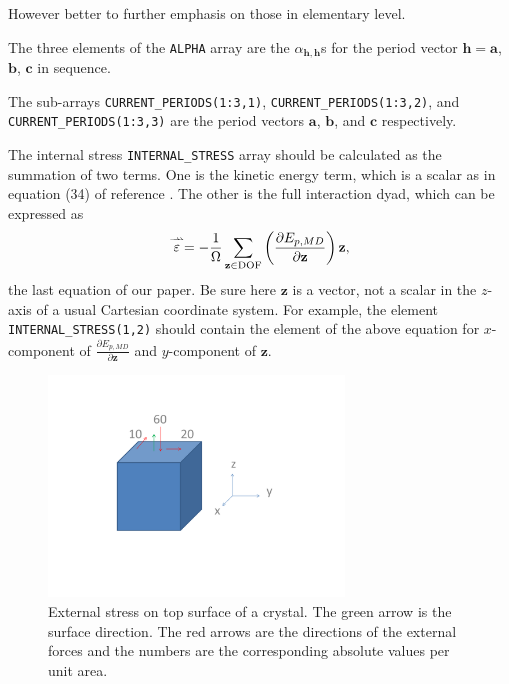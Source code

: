 \documentclass[aps]{revtex4}
\newcommand{\srr}[1]{\stackrel{\rightharpoonup\!\!\!\!\rightharpoonup }{#1}}
\newcommand{\Tep}[0]{\srr{\cal\varepsilon}}
\newcommand{\bh}[0]{\mathbf h}
\newcommand{\ba}{\mathbf a}
\newcommand{\bb}{\mathbf b}
\newcommand{\bc}{\mathbf c}
\begin{document}
However better to further emphasis on those in elementary level.  

The three elements of the \verb!ALPHA! array are the $\alpha _{\bh,\bh}$s for the period vector $\bh=\ba$, $\bb$, $\bc$ in sequence.

The sub-arrays \verb!CURRENT_PERIODS(1:3,1)!,  \verb!CURRENT_PERIODS(1:3,2)!, and  \verb!CURRENT_PERIODS(1:3,3)! 
are the period vectors $\ba$, $\bb$, and $\bc$ respectively. 

The internal stress \verb!INTERNAL_STRESS! array should be 
calculated as the summation of two terms. One is 
the kinetic energy term, which is a scalar as in equation (34) of reference \cite{glarxiv}. The other is the full interaction dyad, which can be 
expressed as
\begin{equation}
\Tep=-\frac 1\Omega \sum_{\mathbf z\in\text{DOF}} \left( \frac{\partial E_{p,MD}}{\partial\mathbf z}\right)\mathbf z,
\label{verynew}
\end{equation}
the last equation of our paper\cite{glcjp,glarxiv}. Be sure here $\mathbf z$ is a vector, not a scalar in the $z$-axis of a usual 
Cartesian coordinate system. For example, the element \verb!INTERNAL_STRESS(1,2)! should contain the element of the above 
equation for  $x$-component of $ \frac{\partial E_{p,MD}}{\partial\mathbf z}$ and  $y$-component of $\mathbf z$. 

\newpage







  \vspace{0cm}
\begin{figure}
  \begin{center}
    \hspace{0cm}
    \includegraphics[width=0.7\textwidth]{./anexternalstressexample2.pdf}
  \end{center}
  \vspace{-3cm}
  \caption{External stress on top surface of a crystal. The green arrow is the surface direction. The red arrows are the directions of the external forces and the numbers are the corresponding absolute values per unit area.}
  \label{fig1}
\end{figure}
\end{document}
